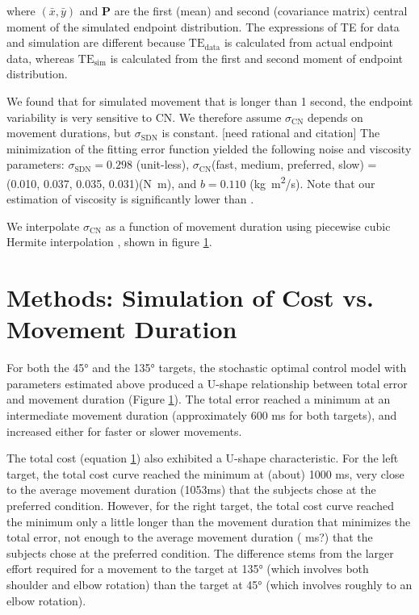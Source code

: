 where $(\bar{x},\bar{y})$ and $\bm{P}$ are the first (mean) and second (covariance matrix) central moment of the simulated endpoint distribution. 
The expressions of TE for data and simulation are different because $\text{TE}_{\text{data}}$ is calculated from actual endpoint data, whereas $\text{TE}_{\text{sim}}$ is calculated from the first and second moment of endpoint distribution.
		
We found that for simulated movement that is longer than 1 second, the endpoint variability is very sensitive to CN.
We therefore assume $\sigma_{\text{CN}}$ depends on movement durations, but $\sigma_{\text{SDN}}$ is constant. [need rational and citation] 
The minimization of the fitting error function yielded the following noise and viscosity parameters: $\sigma_{\text{SDN}} = 0.298$ (unit-less), $\sigma_{\text{CN}}$(fast, medium, preferred, slow) = (0.010, 0.037, 0.035, 0.031)(\si{N.m}), and $b=0.110$ (\si{kg.m^2/s}). 
Note that our estimation of viscosity is significantly lower than \cite{VanBeers2004}. 

We interpolate $\sigma_{\text{CN}}$ as a function of movement duration using piecewise cubic Hermite interpolation \cite{Fritsch1980}, shown in figure \ref{}.

\section{Methods: Simulation of Cost vs. Movement Duration}

For both the \ang{45} and the \ang{135} targets, the stochastic optimal control model with parameters estimated above produced a U-shape relationship between total error and movement duration (Figure \ref{}). The total error reached a minimum at an intermediate movement duration (approximately 600 ms for both targets), and increased either for faster or slower movements. 

The total cost (equation \ref{}) also exhibited a U-shape characteristic. 
For the left target, the total cost curve reached the minimum at (about) 1000 ms, very close to the average movement duration (1053ms)  that the subjects chose at the preferred condition. 
However, for the right target, the total cost curve reached the minimum only a little longer than the movement duration that minimizes the total error, not enough to the average movement duration ( ms?) that the subjects chose at the preferred condition.
The difference stems from the larger effort required for a movement to the target at \ang{135} (which involves both shoulder and elbow rotation) than the target at \ang{45} (which involves roughly to an elbow rotation).

